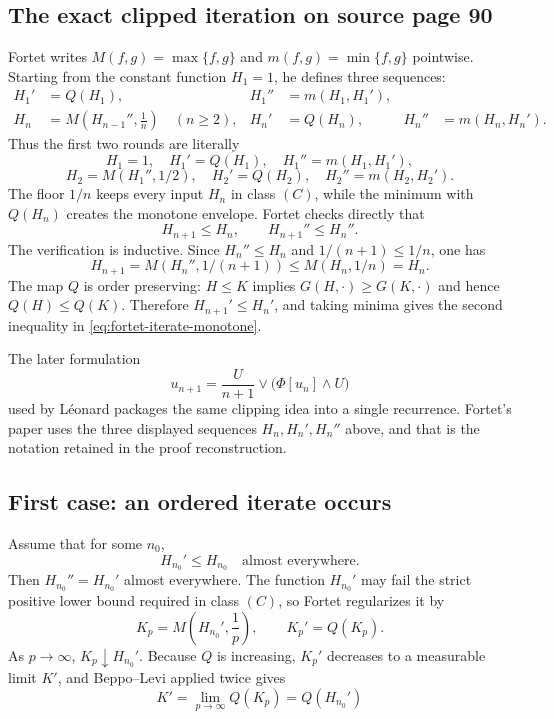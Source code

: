 \subsection{The exact clipped iteration on source page 90}
Fortet writes $M(f,g)=\max\{f,g\}$ and $m(f,g)=\min\{f,g\}$ pointwise.
Starting from the constant function $H_1=1$, he defines three sequences:
\begin{align*}
  H_1'&=Q(H_1),
  &H_1''&=m(H_1,H_1'),\\
  H_n&=M\!\left(H_{n-1}'',\frac1n\right) \quad (n\ge2),
  &H_n'&=Q(H_n),
  &H_n''&=m(H_n,H_n').
\end{align*}
Thus the first two rounds are literally
\[
  H_1=1,\quad H_1'=Q(H_1),\quad H_1''=m(H_1,H_1'),
\]
\[
  H_2=M(H_1'',1/2),\quad H_2'=Q(H_2),\quad
  H_2''=m(H_2,H_2').
\]
The floor $1/n$ keeps every input $H_n$ in class $(C)$, while the minimum with
$Q(H_n)$ creates the monotone envelope.  Fortet checks directly that
\begin{equation}
  H_{n+1}\le H_n,
  \qquad
  H_{n+1}''\le H_n''. \tag{I}\label{eq:fortet-iterate-monotone}
\end{equation}
The verification is inductive.  Since $H_n''\le H_n$ and
$1/(n+1)\le1/n$, one has
\[
  H_{n+1}=M(H_n'',1/(n+1))\le M(H_n,1/n)=H_n.
\]
The map $Q$ is order preserving: $H\le K$ implies
$G(H,\cdot)\ge G(K,\cdot)$ and hence $Q(H)\le Q(K)$.  Therefore
$H_{n+1}'\le H_n'$, and taking minima gives the second inequality in
\eqref{eq:fortet-iterate-monotone}.

\begin{remark}
The later formulation
\[
  u_{n+1}=\frac{U}{n+1}\vee\bigl(\Phi[u_n]\wedge U\bigr)
\]
used by L\'eonard \cite[Eq.~(3.3)]{Leonard2019} packages the same clipping
idea into a single recurrence.  Fortet's paper uses the three displayed
sequences $H_n,H_n',H_n''$ above, and that is the notation retained in the
proof reconstruction.
\end{remark}

\subsection{First case: an ordered iterate occurs}
Assume that for some $n_0$,
\[
  H_{n_0}'\le H_{n_0}
  \quad\text{almost everywhere}.
\]
Then $H_{n_0}''=H_{n_0}'$ almost everywhere.  The function
$H_{n_0}'$ may fail the strict positive lower bound required in class $(C)$,
so Fortet regularizes it by
\[
  K_p=M\!\left(H_{n_0}',\frac1p\right),
  \qquad K_p'=Q(K_p).
\]
As $p\to\infty$, $K_p\downarrow H_{n_0}'$.  Because $Q$ is increasing,
$K_p'$ decreases to a measurable limit $K'$, and Beppo--Levi applied twice
gives
\[
  K'=\lim_{p\to\infty}Q(K_p)=Q(H_{n_0}')
\]


